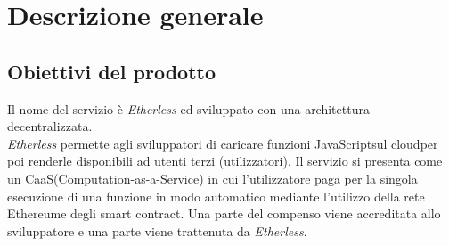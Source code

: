 \section{Descrizione generale}

\subsection{Obiettivi del prodotto}
Il nome del servizio è \textit{Etherless} ed sviluppato con una architettura decentralizzata\glo.\\ \textit{Etherless} permette agli sviluppatori di caricare funzioni JavaScript\glo sul cloud\glo per poi renderle disponibili ad utenti terzi (utilizzatori). Il servizio si presenta come un CaaS\glo (Computation\glo-as-a-Service) in cui l’utilizzatore paga per la singola esecuzione di una funzione in modo automatico mediante l’utilizzo della rete Ethereum\glo e degli smart contract\glo. Una parte del compenso viene accreditata allo sviluppatore e una parte viene trattenuta da \textit{Etherless}.

